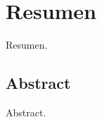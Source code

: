 \begingroup
\let\clearpage\relax
\let\cleardoublepage\relax
\let\cleardoublepage\relax

\chapter*{Resumen}
Resumen.

\vfill

\begin{otherlanguage}{american}
\chapter*{Abstract}
Abstract.
\end{otherlanguage}

\endgroup

\vfill
